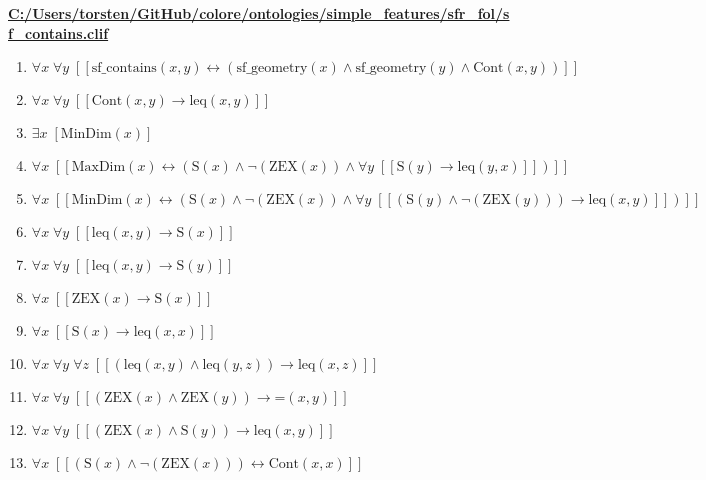 \documentclass{article}
\begin{document}
\textbf{\url{C:/Users/torsten/GitHub/colore/ontologies/simple\_features/sfr\_fol/sf\_contains.clif}}

\begin{enumerate}
\item $\forall x\; \forall y\;  \left[ \left[ \textrm{sf\_contains}(x,y) \leftrightarrow \left(\textrm{sf\_geometry}(x) \land \textrm{sf\_geometry}(y) \land \textrm{Cont}(x,y)\right) \right] \right]$
\item $\forall x\; \forall y\;  \left[ \left[ \textrm{Cont}(x,y) \rightarrow \textrm{leq}(x,y) \right] \right]$
\item $\exists x\;  \left[ \textrm{MinDim}(x) \right]$
\item $\forall x\;  \left[ \left[ \textrm{MaxDim}(x) \leftrightarrow \left(\textrm{S}(x) \land \neg \left(\textrm{ZEX}(x)\right) \land \forall y\;  \left[ \left[ \textrm{S}(y) \rightarrow \textrm{leq}(y,x) \right] \right]\right) \right] \right]$
\item $\forall x\;  \left[ \left[ \textrm{MinDim}(x) \leftrightarrow \left(\textrm{S}(x) \land \neg \left(\textrm{ZEX}(x)\right) \land \forall y\;  \left[ \left[ \left(\textrm{S}(y) \land \neg \left(\textrm{ZEX}(y)\right)\right) \rightarrow \textrm{leq}(x,y) \right] \right]\right) \right] \right]$
\item $\forall x\; \forall y\;  \left[ \left[ \textrm{leq}(x,y) \rightarrow \textrm{S}(x) \right] \right]$
\item $\forall x\; \forall y\;  \left[ \left[ \textrm{leq}(x,y) \rightarrow \textrm{S}(y) \right] \right]$
\item $\forall x\;  \left[ \left[ \textrm{ZEX}(x) \rightarrow \textrm{S}(x) \right] \right]$
\item $\forall x\;  \left[ \left[ \textrm{S}(x) \rightarrow \textrm{leq}(x,x) \right] \right]$
\item $\forall x\; \forall y\; \forall z\;  \left[ \left[ \left(\textrm{leq}(x,y) \land \textrm{leq}(y,z)\right) \rightarrow \textrm{leq}(x,z) \right] \right]$
\item $\forall x\; \forall y\;  \left[ \left[ \left(\textrm{ZEX}(x) \land \textrm{ZEX}(y)\right) \rightarrow \textrm{=}(x,y) \right] \right]$
\item $\forall x\; \forall y\;  \left[ \left[ \left(\textrm{ZEX}(x) \land \textrm{S}(y)\right) \rightarrow \textrm{leq}(x,y) \right] \right]$
\item $\forall x\;  \left[ \left[ \left(\textrm{S}(x) \land \neg \left(\textrm{ZEX}(x)\right)\right) \leftrightarrow \textrm{Cont}(x,x) \right] \right]$

\end{enumerate}
\end{document}
